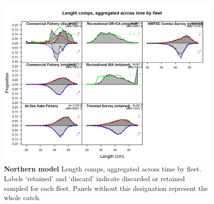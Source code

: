 \documentclass[12pt,]{article}
\begin{document}
\begin{figure}[htbp]
\centering
\includegraphics{./r4ss/plots_mod1/comp_lenfit__aggregated_across_time.png}
\caption{\textbf{Northern model} Length comps, aggregated across time by
fleet. Labels `retained' and `discard' indicate discarded or retained
sampled for each fleet. Panels without this designation represent the
whole catch. \label{fig:mod1_30_comp_lenfit__aggregated_across_time}}
\end{figure}
\end{document}
